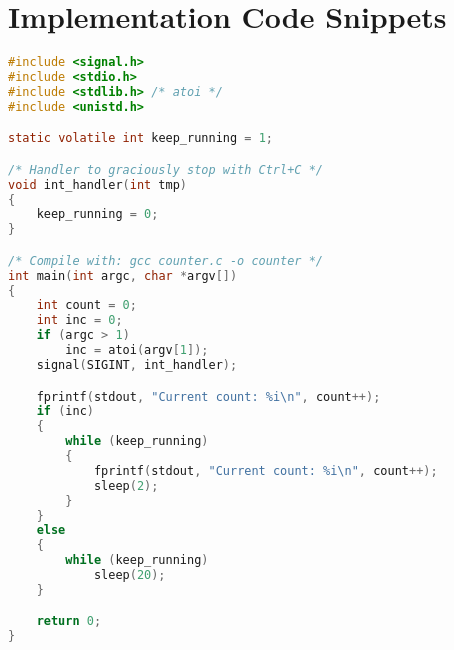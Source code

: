 \chapter{Implementation Code Snippets} \label{chap:app-code}

\begin{lstlisting}[language=C,caption={Simple counter in C.},label={code:c-counter}]
#include <signal.h>
#include <stdio.h>
#include <stdlib.h> /* atoi */
#include <unistd.h>

static volatile int keep_running = 1;

/* Handler to graciously stop with Ctrl+C */
void int_handler(int tmp)
{
    keep_running = 0;
}

/* Compile with: gcc counter.c -o counter */
int main(int argc, char *argv[])
{
    int count = 0;
    int inc = 0;
    if (argc > 1)
        inc = atoi(argv[1]);
    signal(SIGINT, int_handler);

    fprintf(stdout, "Current count: %i\n", count++);
    if (inc)
    {
        while (keep_running)
        {
            fprintf(stdout, "Current count: %i\n", count++);
            sleep(2);
        }
    }
    else 
    {
        while (keep_running)
            sleep(20);
    }

    return 0;
}
\end{lstlisting}

